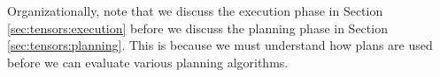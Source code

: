 Organizationally, note that we discuss the execution phase in Section \ref{sec:tensors:execution} before we discuss the planning phase in Section \ref{sec:tensors:planning}. 
This is because we must understand how plans are used before we can evaluate various planning algorithms.

